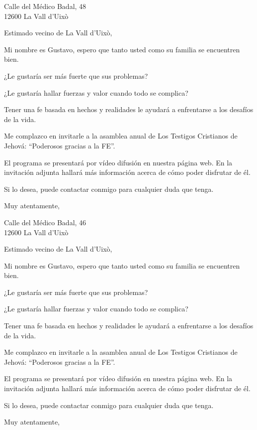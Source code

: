 \documentclass{scrlttr2}
\begin{document}
\begin{letter}{%
Calle del Médico Badal, 48\\
12600 La Vall d'Uixò\\
}
\opening{Estimado vecino de La Vall d'Uixò,}

Mi nombre es Gustavo, espero que tanto usted como su familia se encuentren bien.

¿Le gustaría ser más fuerte que sus problemas?

¿Le gustaría hallar fuerzas y valor cuando todo se complica?

Tener una fe basada en hechos y realidades le ayudará a enfrentarse a los desafíos de la vida.

Me complazco en invitarle a la asamblea anual de Los Testigos Cristianos de Jehová: ``Poderosos gracias a la FE''.

El programa se presentará por vídeo difusión en nuestra página web. En la invitación adjunta hallará más información acerca de cómo poder disfrutar de él.

Si lo desea, puede contactar conmigo para cualquier duda que tenga.

\closing{Muy atentamente,}


\end{letter}
\begin{letter}{%
Calle del Médico Badal, 46\\
12600 La Vall d'Uixò\\
}
\opening{Estimado vecino de La Vall d'Uixò,}

Mi nombre es Gustavo, espero que tanto usted como su familia se encuentren bien.

¿Le gustaría ser más fuerte que sus problemas?

¿Le gustaría hallar fuerzas y valor cuando todo se complica?

Tener una fe basada en hechos y realidades le ayudará a enfrentarse a los desafíos de la vida.

Me complazco en invitarle a la asamblea anual de Los Testigos Cristianos de Jehová: ``Poderosos gracias a la FE''.

El programa se presentará por vídeo difusión en nuestra página web. En la invitación adjunta hallará más información acerca de cómo poder disfrutar de él.

Si lo desea, puede contactar conmigo para cualquier duda que tenga.

\closing{Muy atentamente,}


\end{letter}
\end{document}
